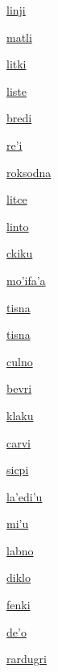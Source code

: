 {\hyperlink{val:linji}{linji}}{}{}{}

{\hyperlink{val:matli}{matli}}{}{}{}

{\hyperlink{val:litki}{litki}}{}{}{}

{\hyperlink{val:liste}{liste}}{}{}{}

{\hyperlink{val:bredi}{bredi}}{}{}{}

{\hyperlink{val:rehi}{re'i}}{}{}{}

{\hyperlink{val:roksodna}{roksodna}}{}{}{}

{\hyperlink{val:litce}{litce}}{}{}{}

{\hyperlink{val:linto}{linto}}{}{}{}

{\hyperlink{val:ckiku}{ckiku}}{}{}{}

{\hyperlink{val:mohifaha}{mo'ifa'a}}{}{}{}

{\hyperlink{val:tisna}{tisna}}{}{}{}

{\hyperlink{val:tisna}{tisna}}{}{}{}

{\hyperlink{val:culno}{culno}}{}{}{}

{\hyperlink{val:bevri}{bevri}}{}{}{}

{\hyperlink{val:klaku}{klaku}}{}{}{}

{\hyperlink{val:carvi}{carvi}}{}{}{}

{\hyperlink{val:sicpi}{sicpi}}{}{}{}

{\hyperlink{val:lahedihu}{la'edi'u}}{}{}{}

{\hyperlink{val:mihu}{mi'u}}{}{}{}

{\hyperlink{val:labno}{labno}}{}{}{}

{\hyperlink{val:diklo}{diklo}}{}{}{}

{\hyperlink{val:fenki}{fenki}}{}{}{}

{\hyperlink{val:deho}{de'o}}{}{}{}

{\hyperlink{val:rardugri}{rardugri}}{}{}{}

